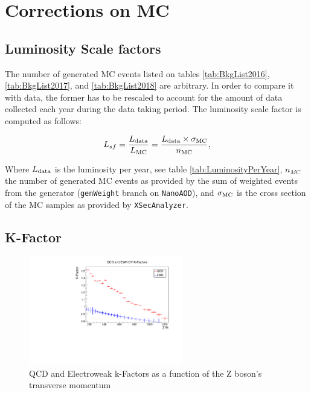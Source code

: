 \section{Corrections on MC} \label{CorrectionsOnMC}

\subsection{Luminosity Scale factors}

The number of generated MC events listed on tables \ref{tab:BkgList2016}, \ref{tab:BkgList2017},
and \ref{tab:BkgList2018} are arbitrary. In order to compare it with data, the
former has to be rescaled to account for the amount of data collected each year
during the data taking period. The luminosity scale factor is computed as follows:

\begin{equation}
  L_{sf}=\frac{L_{\rm data}}{L_{\rm MC}} = \frac{L_{\rm data}\times\sigma_{\rm MC}}{n_{\rm MC}},
\label{eq:lumiSF}
\end{equation}

Where $L_{\rm data}$ is the luminosity per year, see table \ref{tab:LuminosityPerYear},
$n_{MC}$ the number of generated MC events as provided by the sum of weighted events
from the generator (\verb|genWeight| branch on \verb|NanoAOD|), and $\sigma_{\rm MC}$
is the cross section of the MC samples as provided by \verb|XSecAnalyzer|.

\subsection{K-Factor}

\begin{figure}[tph]
  \centering
  \includegraphics[width=0.6\textwidth]{fig/ScaleFactors/QCD_EWK_DYKFactors.pdf}
  \caption{QCD and Electroweak k-Factors as a function of the Z boson's transverse
   momentum
  }
  \label{fig:kFactors}
\end{figure}

